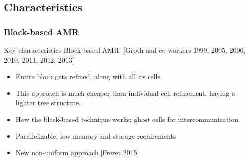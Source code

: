 \documentclass{beamer}
\begin{document}
\subsection{Characteristics}
\begin{frame}%
\frametitle{Block-based AMR}
\tiny
\begin{minipage}[t][1\textheight]{1\textwidth}
\vspace{-15pt}
\begin{exampleblock}{Key characteristics}
Block-based AMR: [Groth and co-workers 1999, 2005, 2006, 2010, 2011, 2012, 2013] \newline

\begin{itemize}
\tiny
\item Entire block gets refined, along with all its cells. 
\item This approach is much cheaper than individual cell refinement, having a lighter tree structure.
\item How the block-based technique works; ghost cells for intercommunication 
\item Parallelizable, low memory and storage requirements
\item New non-uniform approach [Freret 2015]
\end{itemize}


\end{exampleblock}
\end{minipage}
\end{frame}
\end{document}
